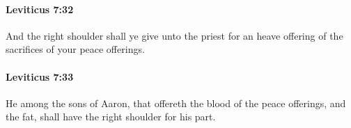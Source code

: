 		\paragraph{Leviticus 7:32} %
			\label{LEVITICUS-7-32}

			And the right shoulder shall ye give unto the priest for an heave offering of the sacrifices of your peace offerings.


		\paragraph{Leviticus 7:33} %
			\label{LEVITICUS-7-33}

			He among the sons of Aaron, that offereth the blood of the peace offerings, and the fat, shall have the right shoulder for his part.


